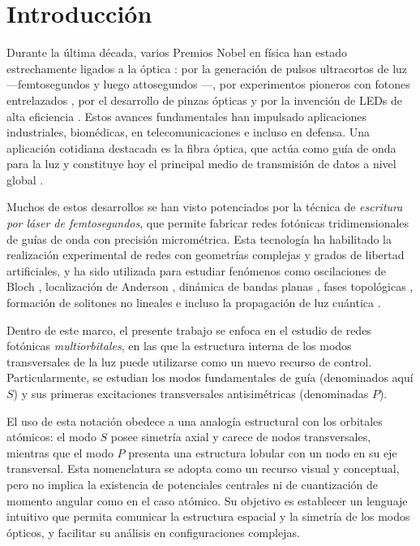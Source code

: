 \chapter{Introducción}

Durante la última década, varios Premios Nobel en física han estado estrechamente ligados a la óptica \cite{nobel}: por la generación de pulsos ultracortos de luz —femtosegundos \cite{femto1} y luego attosegundos \cite{atto1, atto2, atto3}—, por experimentos pioneros con fotones entrelazados \cite{photons1, photons2, photons3}, por el desarrollo de pinzas ópticas \cite{opticaltweezers} y por la invención de LEDs de alta eficiencia \cite{led1, led2, led3}. Estos avances fundamentales han impulsado aplicaciones industriales, biomédicas, en telecomunicaciones e incluso en defensa. Una aplicación cotidiana destacada es la fibra óptica, que actúa como guía de onda para la luz y constituye hoy el principal medio de transmisión de datos a nivel global \cite{fibra2, fibra}.

Muchos de estos desarrollos se han visto potenciados por la técnica de \textit{escritura por láser de femtosegundos}, que permite fabricar redes fotónicas tridimensionales de guías de onda con precisión micrométrica. Esta tecnología ha habilitado la realización experimental de redes con geometrías complejas y grados de libertad artificiales, y ha sido utilizada para estudiar fenómenos como oscilaciones de Bloch \cite{BlochOsci}, localización de Anderson \cite{Anderson}, dinámica de bandas planas \cite{lieb1, lieb2, artificialFB, FBdynamics}, fases topológicas \cite{obstopo, obsfloquet, topo1dphoto, toporusos}, formación de solitones no lineales \cite{discretesolitons} e incluso la propagación de luz cuántica \cite{qed, squeezed, topoquantum}.

Dentro de este marco, el presente trabajo se enfoca en el estudio de redes fotónicas \textit{multiorbitales}, en las que la estructura interna de los modos transversales de la luz puede utilizarse como un nuevo recurso de control. Particularmente, se estudian los modos fundamentales de guía (denominados aquí $S$) y sus primeras excitaciones transversales antisimétricas (denominadas $P$).


El uso de esta notación obedece a una analogía estructural con los orbitales atómicos: el modo 
$S$ posee simetría axial y carece de nodos transversales, mientras que el modo $P$ presenta una estructura lobular con un nodo en su eje transversal. Esta nomenclatura se adopta como un recurso visual y conceptual, pero no implica la existencia de potenciales centrales ni de cuantización de momento angular como en el caso atómico. Su objetivo es establecer un lenguaje intuitivo que permita comunicar la estructura espacial y la simetría de los modos ópticos, y facilitar su análisis en configuraciones complejas.

